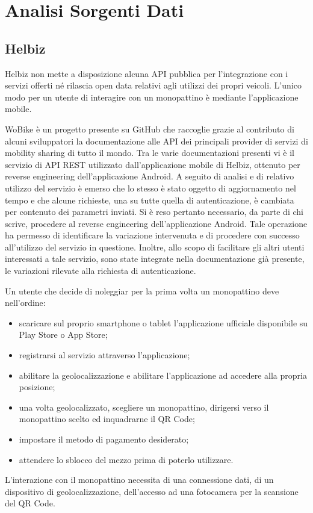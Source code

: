 \chapter{Analisi Sorgenti Dati}

\section{Helbiz}

Helbiz non mette a disposizione alcuna API pubblica per l'integrazione con
i servizi offerti né rilascia open data relativi agli utilizzi dei propri
veicoli. L'unico modo per un utente di interagire con un monopattino è mediante
l'applicazione mobile.

WoBike è un progetto presente su GitHub che raccoglie grazie al contributo
di alcuni sviluppatori la documentazione alle API dei principali 
provider di servizi di mobility sharing di tutto il mondo.
Tra le varie documentazioni presenti vi è il servizio di API REST
utilizzato dall'applicazione mobile di Helbiz, ottenuto per reverse
engineering dell'applicazione Android. A seguito di analisi e di relativo
utilizzo del servizio è emerso che lo stesso è stato oggetto di aggiornamento
nel tempo e che alcune richieste, una su tutte quella di autenticazione,
è cambiata per contenuto dei parametri inviati.
Si è reso pertanto necessario, da parte di chi scrive, procedere al reverse
engineering dell'applicazione Android. Tale operazione ha permesso di
identificare la variazione intervenuta e di procedere con successo
all'utilizzo del servizio in questione. Inoltre, allo scopo di facilitare
gli altri utenti interessati a tale servizio, sono state integrate nella
documentazione già presente, le variazioni rilevate alla richiesta di
autenticazione.

Un utente che decide di noleggiar per la prima volta un monopattino
deve nell'ordine:
\begin{itemize}
\item scaricare sul proprio smartphone o tablet l'applicazione ufficiale
disponibile su Play Store o App Store;
\item registrarsi al servizio attraverso l'applicazione;
\item abilitare la geolocalizzazione e abilitare l'applicazione ad accedere
alla propria posizione;
\item una volta geolocalizzato, scegliere un monopattino, dirigersi verso
il monopattino scelto ed inquadrarne il QR Code;
\item impostare il metodo di pagamento desiderato;
\item attendere lo sblocco del mezzo prima di poterlo utilizzare.
\end{itemize}
L'interazione con il monopattino necessita di una connessione dati, di
un dispositivo di geolocalizzazione, dell'accesso ad una fotocamera
per la scansione del QR Code.


